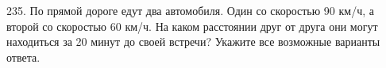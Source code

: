 235. По прямой дороге едут два автомобиля. Один со скоростью 90 км/ч, а второй со скоростью 60 км/ч. На каком расстоянии друг от друга они могут находиться за 20 минут до своей встречи? Укажите все возможные варианты ответа.\\
